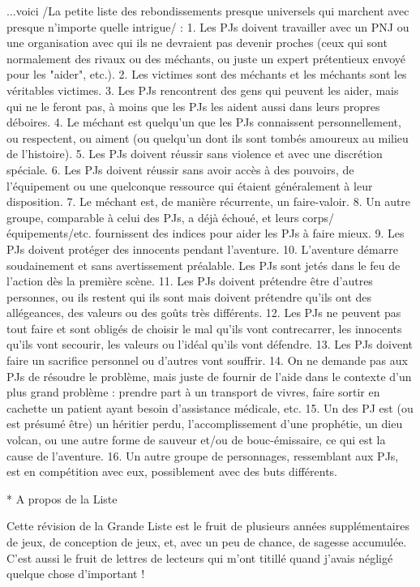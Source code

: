 \begin{enumerate}
...voici /La petite liste des rebondissements presque universels qui marchent avec presque n'importe quelle intrigue/ :
1. Les PJs doivent travailler avec un PNJ ou une organisation avec qui ils ne devraient pas devenir proches (ceux qui sont normalement des rivaux ou des méchants, ou juste un expert prétentieux envoyé pour les "aider", etc.).
2. Les victimes sont des méchants et les méchants sont les véritables victimes.
3. Les PJs rencontrent des gens qui peuvent les aider, mais qui ne le feront pas, à moins que les PJs les aident aussi dans leurs propres déboires.
4. Le méchant est quelqu'un que les PJs connaissent personnellement, ou respectent, ou aiment (ou quelqu'un dont ils sont tombés amoureux au milieu de l'histoire).
5. Les PJs doivent réussir sans violence et avec une discrétion spéciale.
6. Les PJs doivent réussir sans avoir accès à des pouvoirs, de l'équipement ou une quelconque ressource qui étaient généralement à leur disposition.
7. Le méchant est, de manière récurrente, un faire-valoir.
8. Un autre groupe, comparable à celui des PJs, a déjà échoué, et leurs corps/équipements/etc. fournissent des indices pour aider les PJs à faire mieux.
9. Les PJs doivent protéger des innocents pendant l'aventure.
10. L'aventure démarre soudainement et sans avertissement préalable. Les PJs sont jetés dans le feu de l'action dès la première scène.
11. Les PJs doivent prétendre être d'autres personnes, ou ils restent qui ils sont mais doivent prétendre qu'ils ont des allégeances, des valeurs ou des goûts très différents. 
12. Les PJs ne peuvent pas tout faire et sont obligés de choisir le mal qu'ils vont contrecarrer, les innocents qu'ils vont secourir, les valeurs ou l'idéal qu'ils vont défendre.
13. Les PJs doivent faire un sacrifice personnel ou d'autres vont souffrir.
14. On ne demande pas aux PJs de résoudre le problème, mais juste de fournir de l'aide dans le contexte d'un plus grand problème : prendre part à un transport de vivres, faire sortir en cachette un patient ayant besoin d'assistance médicale, etc.
15. Un des PJ est (ou est présumé être) un héritier perdu, l'accomplissement d'une prophétie, un dieu volcan, ou une autre forme de sauveur et/ou de bouc-émissaire, ce qui est la cause de l'aventure.
16. Un autre groupe de personnages, ressemblant aux PJs, est en compétition avec eux, possiblement avec des buts différents.

* A propos de la Liste

Cette révision de la Grande Liste est le fruit de plusieurs années supplémentaires de jeux, de conception de jeux, et, avec un peu de chance, de sagesse accumulée. C'est aussi le fruit de lettres de lecteurs qui m'ont titillé quand j'avais négligé quelque chose d'important !


\end{enumerate}
